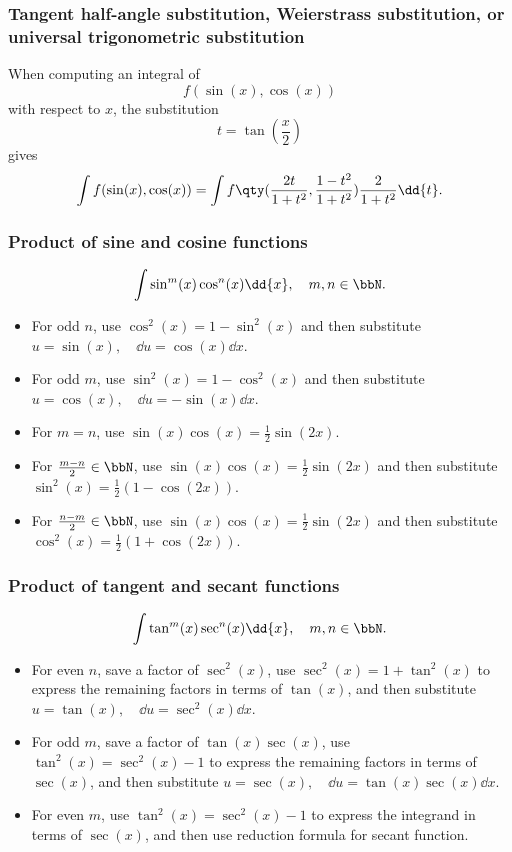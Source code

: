\documentclass[a4paper,12pt]{report}
\begin{document}
\begin{itemize}
\begin{itemize}
\subsubsection{Tangent half-angle substitution, Weierstrass substitution, or universal trigonometric substitution}
When computing an integral of
\[f(\sin(x),\cos(x))\]
with respect to $x$, the substitution
\[t=\tan(\frac{x}{2})\]
gives
\[\int f(\sin(x),\cos(x))=\int f\qty(\frac{2t}{1+t^2},\frac{1-t^2}{1+t^2})\frac{2}{1+t^2}\dd{t}.\]
\subsubsection{Product of sine and cosine functions}
\[\int\sin^m(x)\cos^n(x)\dd{x},\quad m,n\in\bbN.\]
\begin{itemize}
\item For odd $n$, use $\cos^2(x)=1-\sin^2(x)$ and then substitute $u=\sin(x),\quad\dd{u}=\cos(x)\dd{x}$.
\item For odd $m$, use $\sin^2(x)=1-\cos^2(x)$ and then substitute $u=\cos(x),\quad\dd{u}=-\sin(x)\dd{x}$.
\item For $m=n$, use $\sin(x)\cos(x)=\frac{1}{2}\sin(2x)$.
\item For $\frac{m-n}{2}\in\bbN$, use $\sin(x)\cos(x)=\frac{1}{2}\sin(2x)$ and then substitute $\sin^2(x)=\frac{1}{2}(1-\cos(2x))$.
\item For $\frac{n-m}{2}\in\bbN$, use $\sin(x)\cos(x)=\frac{1}{2}\sin(2x)$ and then substitute $\cos^2(x)=\frac{1}{2}(1+\cos(2x))$.
\end{itemize}
\subsubsection{Product of tangent and secant functions}
\[\int\tan^m(x)\sec^n(x)\dd{x},\quad m,n\in\bbN.\]
\begin{itemize}
\item For even $n$, save a factor of $\sec^2(x)$, use $\sec^2(x)=1+\tan^2(x)$ to express the remaining factors in terms of $\tan(x)$, and then substitute $u=\tan(x),\quad\dd{u}=\sec^2(x)\dd{x}$.
\item For odd $m$, save a factor of $\tan(x)\sec(x)$, use $\tan^2(x)=\sec^2(x)-1$ to express the remaining factors in terms of $\sec(x)$, and then substitute $u=\sec(x),\quad\dd{u}=\tan(x)\sec(x)\dd{x}$.
\item For even $m$, use $\tan^2(x)=\sec^2(x)-1$ to express the integrand in terms of $\sec(x)$, and then use reduction formula for secant function.
\end{itemize}

\end{itemize}
\end{itemize}
\end{document}
